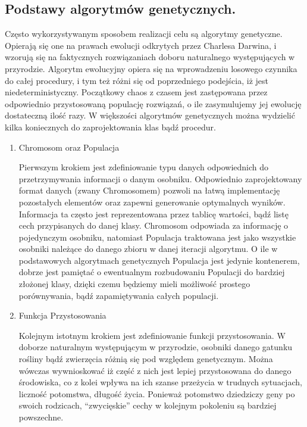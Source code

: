\subsection{Podstawy algorytmów genetycznych.}
\begin{par}
Często wykorzystywanym sposobem realizacji celu są algorytmy genetyczne.
Opierają się one na prawach ewolucji odkrytych przez Charlesa Darwina, i wzorują się na faktycznych rozwiązaniach doboru naturalnego występujących w przyrodzie.
Algorytm ewolucyjny opiera się na wprowadzeniu losowego czynnika do całej procedury, i tym też różni się od poprzedniego podejścia, iż jest niedeterministyczny. 
Początkowy chaos z czasem jest zastępowana przez odpowiednio przystosowaną populację rozwiązań, o ile zasymulujemy jej ewolucję dostateczną ilość razy. 
W większości algorytmów genetycznych można wydzielić kilka koniecznych do zaprojektowania klas bądź procedur.
\begin{enumerate}
\item Chromosom oraz Populacja
	\begin{par}
		Pierwszym krokiem jest zdefiniowanie typu danych odpowiednich do przetrzymywania informacji o danym osobniku.
		Odpowiednio zaprojektowany format danych (zwany Chromosomem) pozwoli na łatwą implementację pozostałych elementów oraz zapewni generowanie optymalnych wyników.
		Informacja ta często jest reprezentowana przez tablicę wartości, bądź listę cech przypisanych do danej klasy. 
		Chromosom odpowiada za informację o pojedynczym osobniku, natomiast Populacja traktowana jest jako wszystkie osobniki należące do danego zbioru w danej iteracji algorytmu. 
		O ile w podstawowych algorytmach genetycznych Populacja jest jedynie kontenerem, dobrze jest pamiętać o ewentualnym rozbudowaniu Populacji do bardziej złożonej klasy, dzięki czemu będziemy mieli możliwość prostego porównywania, bądź zapamiętywania całych populacji.
	\end{par}
\item Funkcja Przystosowania
	\begin{par}
		Kolejnym istotnym krokiem jest zdefiniowanie funkcji przystosowania.
		W doborze naturalnym występującym w przyrodzie, osobniki danego gatunku rośliny bądź zwierzęcia różnią się pod względem genetycznym. 
		Można wówczas wywnioskować iż część z nich jest lepiej przystosowana do danego środowiska, co z kolei wpływa na ich szanse przeżycia w trudnych sytuacjach, liczność potomstwa, długość życia.
		Ponieważ potomstwo dziedziczy geny po swoich rodzicach, ``zwycięskie'' cechy w kolejnym pokoleniu są bardziej powszechne.

\end{par}
\end{enumerate}
\end{par}
